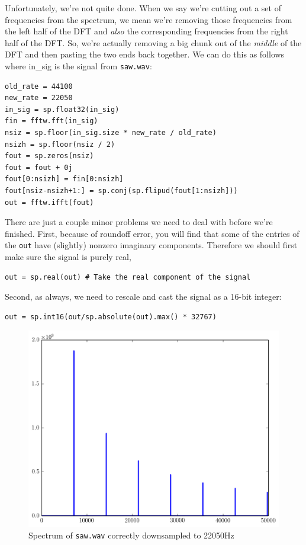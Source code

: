 Unfortunately, we're not quite done. When we say we're cutting out a set of frequencies from the spectrum, we mean we're removing those frequencies from the left half of the DFT and \emph{also} the corresponding frequencies from the right half of the DFT. So, we're actually removing a big chunk out of the \emph{middle} of the DFT and then pasting the two ends back together. We can do this as follows where in\_sig is the signal from \texttt{saw.wav}:

\begin{lstlisting}
old_rate = 44100
new_rate = 22050
in_sig = sp.float32(in_sig)
fin = fftw.fft(in_sig)
nsiz = sp.floor(in_sig.size * new_rate / old_rate)
nsizh = sp.floor(nsiz / 2)
fout = sp.zeros(nsiz)
fout = fout + 0j
fout[0:nsizh] = fin[0:nsizh]
fout[nsiz-nsizh+1:] = sp.conj(sp.flipud(fout[1:nsizh]))
out = fftw.ifft(fout)
\end{lstlisting}

There are just a couple minor problems we need to deal with before we're finished.
First, because of roundoff error, you will find that some of the entries of the \texttt{out} have (slightly) nonzero imaginary components. Therefore we should first make sure the signal is purely real,

\begin{lstlisting}
out = sp.real(out) # Take the real component of the signal
\end{lstlisting}

Second, as always, we need to rescale and cast the signal as a 16-bit integer:

\begin{lstlisting}
out = sp.int16(out/sp.absolute(out).max() * 32767)
\end{lstlisting}

\begin{figure}[ht]\caption{Spectrum of \texttt{saw.wav} correctly downsampled to 22050Hz}\label{sawspecdown2}\centering\includegraphics[width=\textwidth]{sawdownspec}\end{figure}

